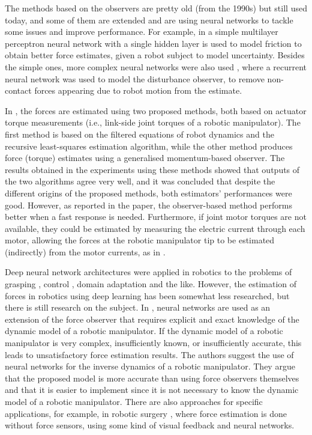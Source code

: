 The methods based on the observers are pretty old (from the 1990s) but still used today, and some of them are extended and are using neural networks to tackle some issues and improve performance. For example, in \cite{Liu2021} a simple multilayer perceptron neural network with a single hidden layer is used to model friction to obtain better force estimates, given a robot subject to model uncertainty. Besides the simple ones, more complex neural networks were also used \cite{Dine2020}, where a recurrent neural network was used to model the disturbance observer, to remove non-contact forces appearing due to robot motion from the estimate.

In \cite{Damme2011}, the forces are estimated using two proposed methods, both based on actuator torque measurements (i.e., link-side joint torques of a robotic manipulator). The first method is based on the filtered equations of robot dynamics and the recursive least-squares estimation algorithm, while the other method produces force (torque) estimates using a generalised momentum-based observer. The results obtained in the experiments using these methods showed that outputs of the two algorithms agree very well, and it was concluded that despite the different origins of the proposed methods, both estimators' performances were good. However, as reported in the paper, the observer-based method performs better when a fast response is needed. Furthermore, if joint motor torques are not available, they could be estimated by measuring the electric current through each motor, allowing the forces at the robotic manipulator tip to be estimated (indirectly) from the motor currents, as in \cite{Wahrburg2018}.

Deep neural network architectures were applied in robotics to the problems of grasping \cite{Levine2017}, control \cite{Jin2018}, domain adaptation \cite{Bousmalis2018} and the like. However, the estimation of forces in robotics using deep learning has been somewhat less researched, but there is still research on the subject. In \cite{Smith2005}, neural networks are used as an extension of the force observer that requires explicit and exact knowledge of the dynamic model of a robotic manipulator. If the dynamic model of a robotic manipulator is very complex, insufficiently known, or insufficiently accurate, this leads to unsatisfactory force estimation results. The authors suggest the use of neural networks for the inverse dynamics of a robotic manipulator. They argue that the proposed model is more accurate than using force observers themselves and that it is easier to implement since it is not necessary to know the dynamic model of a robotic manipulator. There are also approaches for specific applications, for example, in robotic surgery \cite{Marban2019,Aviles2015}, where force estimation is done without force sensors, using some kind of visual feedback and neural networks.

